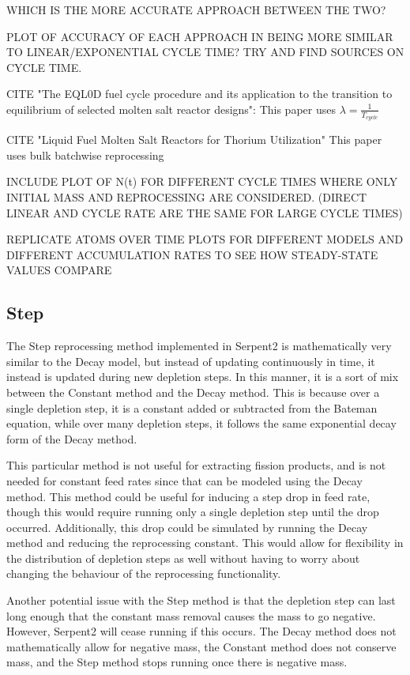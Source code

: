 WHICH IS THE MORE ACCURATE APPROACH BETWEEN THE TWO?

PLOT OF ACCURACY OF EACH APPROACH IN BEING MORE SIMILAR TO LINEAR/EXPONENTIAL CYCLE TIME? TRY AND FIND SOURCES ON CYCLE TIME.

CITE "The EQL0D fuel cycle procedure and its application to the transition to
equilibrium of selected molten salt reactor designs": This paper uses $\lambda = \frac{1}{T_{cycle}}$

CITE "Liquid Fuel Molten Salt Reactors for Thorium
Utilization" This paper uses bulk batchwise reprocessing

INCLUDE PLOT OF N(t) FOR DIFFERENT CYCLE TIMES WHERE ONLY INITIAL MASS AND REPROCESSING ARE CONSIDERED. (DIRECT LINEAR AND CYCLE RATE ARE THE SAME FOR LARGE CYCLE TIMES)

REPLICATE ATOMS OVER TIME PLOTS FOR DIFFERENT MODELS AND DIFFERENT ACCUMULATION RATES TO SEE HOW STEADY-STATE VALUES COMPARE

\subsection{Step}

The Step reprocessing method implemented in Serpent2 is mathematically very similar to the Decay model, but instead of updating continuously in time, it instead is updated during new depletion steps. In this manner, it is a sort of mix between the Constant method and the Decay method. This is because over a single depletion step, it is a constant added or subtracted from the Bateman equation, while over many depletion steps, it follows the same exponential decay form of the Decay method.

This particular method is not useful for extracting fission products, and is not needed for constant feed rates since that can be modeled using the Decay method. This method could be useful for inducing a step drop in feed rate, though this would require running only a single depletion step until the drop occurred. Additionally, this drop could be simulated by running the Decay method and reducing the reprocessing constant. This would allow for flexibility in the distribution of depletion steps as well without having to worry about changing the behaviour of the reprocessing functionality. 

Another potential issue with the Step method is that the depletion step can last long enough that the constant mass removal causes the mass to go negative. However, Serpent2 will cease running if this occurs. The Decay method does not mathematically allow for negative mass, the Constant method does not conserve mass, and the Step method stops running once there is negative mass.

